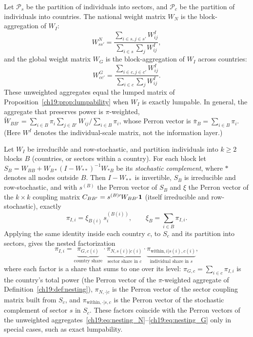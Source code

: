 \documentclass[../structural_economics_book.tex]{subfiles}
\begin{document}
\begin{definition}\label{ch19:def:nesting}
Let $\mathcal{P}_s$ be the partition of individuals into sectors, and $\mathcal{P}_c$ be the partition of individuals into countries. The national weight matrix $W_N$ is the block-aggregation of $W_I$:
\begin{equation}\label{ch19:eq:nesting_N}
W^N_{ss'} = \frac{\sum_{i \in s, j \in s'} W^I_{ij}}{\sum_{i \in s} \sum_{j} W^I_{ij}},
\end{equation}
and the global weight matrix $W_G$ is the block-aggregation of $W_I$ across countries:
\begin{equation}\label{ch19:eq:nesting_G}
W^G_{cc'} = \frac{\sum_{i \in c, j \in c'} W^I_{ij}}{\sum_{i \in c} \sum_j W^I_{ij}}.
\end{equation}
These unweighted aggregates equal the lumped matrix of Proposition~\ref{ch19:prop:lumpability} when $W_I$ is exactly lumpable. In general, the aggregate that preserves power is $\pi$-weighted, $\tilde W_{BB'} = \sum_{i\in B}\pi_i\sum_{j\in B'}W_{ij}/\sum_{i\in B}\pi_i$, whose Perron vector is $\bar\pi_B = \sum_{i\in B}\pi_i$. (Here $W^I$ denotes the individual-scale matrix, not the information layer.)
\end{definition}

\begin{proposition}\label{ch19:thm:nesting}
Let $W_I$ be irreducible and row-stochastic, and partition individuals into $k \ge 2$ blocks $B$ (countries, or sectors within a country). For each block let $S_B = W_{BB} + W_{B\ast}(I - W_{\ast\ast})^{-1}W_{\ast B}$ be its \emph{stochastic complement}, where $\ast$ denotes all nodes outside $B$. Then $I - W_{\ast\ast}$ is invertible, $S_B$ is irreducible and row-stochastic, and with $s^{(B)}$ the Perron vector of $S_B$ and $\xi$ the Perron vector of the $k \times k$ coupling matrix $C_{BB'} = s^{(B)\prime}W_{BB'}\mathbf{1}$ (itself irreducible and row-stochastic), exactly
\[
\pi_{I,i} = \xi_{B(i)}\, s^{(B(i))}_i, \qquad \xi_B = \textstyle\sum_{i\in B}\pi_{I,i}.
\]
Applying the same identity inside each country $c$, to $S_c$ and its partition into sectors, gives the nested factorization
\begin{equation}\label{ch19:eq:nesting_pi}
\pi_{I,i} = \underbrace{\pi_{G,c(i)}}_{\text{country share}} \cdot \underbrace{\pi_{N,s(i)|c(i)}}_{\text{sector share in } c} \cdot \underbrace{\pi_{\text{within},i|s(i),c(i)}}_{\text{individual share in } s},
\end{equation}
where each factor is a share that sums to one over its level: $\pi_{G,c} = \sum_{i\in c}\pi_{I,i}$ is the country's total power (the Perron vector of the $\pi$-weighted aggregate of Definition~\ref{ch19:def:nesting}), $\pi_{N,\cdot|c}$ is the Perron vector of the sector coupling matrix built from $S_c$, and $\pi_{\text{within},\cdot|s,c}$ is the Perron vector of the stochastic complement of sector $s$ in $S_c$. These factors coincide with the Perron vectors of the unweighted aggregates~\eqref{ch19:eq:nesting_N}--\eqref{ch19:eq:nesting_G} only in special cases, such as exact lumpability.
\end{proposition}
\end{document}
